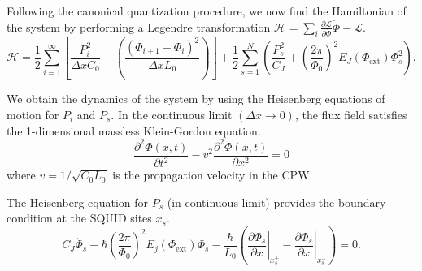 Following the canonical quantization procedure, we now find the Hamiltonian of the system by performing a Legendre transformation $\mathcal{H}=\sum_{i}\frac{\partial\mathcal{L}}{\partial\dot{\Phi}} \dot{\Phi} - \mathcal{L}$.
\begin{equation}
\mathcal{H}=\frac{1}{2}\sum_{i=1}^{\infty}\left[\frac{P_i^2}{\Delta x C_{0}} -\left(\frac{\left(\Phi_{i+1}-\Phi_{i}\right)^{2}}{\Delta x L_{0}}\right)\right] 
 + \frac{1}{2} \sum_{s=1}^{N}\left(\frac{P_s^2}{C_J}+\left(\frac{2\pi}{\Phi_{0}}\right)^{2} E_J\left(\Phi_{\text{ext}}\right) \Phi_{s}^{2}\right).
\end{equation}

We obtain the dynamics of the system by using the Heisenberg equations of motion for $P_i$ and $P_s$. In the continuous limit $(\Delta x \to 0)$, the flux field satisfies the 1-dimensional massless Klein-Gordon equation.
\begin{equation}
\frac{\partial^2\Phi(x,t)}{\partial t^2} - v^2 \frac{\partial^2\Phi(x,t)}{\partial x^2} =0
\end{equation}
%
\color{blue}
where $v = 1 / \sqrt{C_0 L_0}$ is the propagation velocity in the CPW.
\color{black}

The Heisenberg equation for $P_s$ (in continuous limit) provides the boundary condition at the SQUID sites $x_s$.
\begin{equation}\label{eq:BC_field}
C_{J} \ddot{\Phi}_{s}+\hbar\left(\frac{2 \pi}{\Phi_{0}}\right)^{2} E_{j}\left(\Phi_{\text{ext}}\right) \Phi_{s} -\frac{\hbar}{L_{0}}\left(\left.\frac{\partial \Phi_{s}}{\partial x}\right|_{x_s^{+}}-\left.\frac{\partial \Phi_{s}}{\partial x}\right|_{x_s^{-}}\right)=0.
\end{equation}

